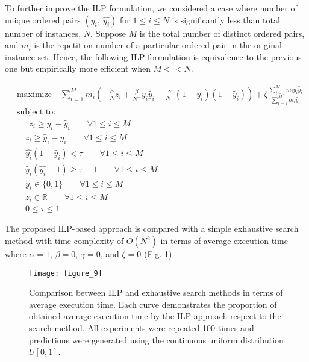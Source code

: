 \documentclass[a4paper]{article}
\begin{document}
To further improve the ILP formulation, we considered a case where number of unique ordered pairs $(y_i,\: \hat{y_i})$ for $1 \le i \le N$ is significantly less than total number of instances, $N$. Suppose $M$ is the total number of distinct ordered pairs, and $m_i$ is the repetition number of a particular ordered pair in the original instance set. Hence, the following ILP formulation is equivalence to the previous one but empirically more efficient when $M << N$.

\begin{equation}
\label{improved_ilp}
\begin{aligned}
&\text{maximize} \quad \sum_{i=1}^{M} m_i \left(-\frac{\alpha}{N}z_i + \frac{\beta}{N^+} y_i \tilde{y_i} + \frac{\gamma}{N^-} (1-y_i) (1-\tilde{y_i})\right) + \zeta \frac{\sum_{i=1}^{M} m_i y_i \tilde{y_i}}{\sum_{i=1}^{M} m_i \tilde{y_i}}\\
&\text{subject to:}\\
&\quad \: \: z_i \ge y_i - \tilde{y_i} \qquad \forall 1\le i \le M \qquad\\
& \quad z_i \ge \tilde{y_i}  - y_i \qquad \forall 1\le i \le M \qquad\\
& \quad \hat{y_i} (1 - \tilde{y_i}) < \tau \qquad \forall 1\le i \le M \qquad\\
& \quad  \tilde{y_i} (\hat{y_i} - 1) \ge \tau - 1 \qquad \forall 1\le i \le M \qquad\\
& \quad \tilde{y_i} \in \{0, 1\} \qquad \forall 1\le i \le M \\
& \quad z_i \in \mathbb{R} \qquad \forall 1\le i \le M \\
& \quad  0 \le \tau \le 1
\end{aligned}
\end{equation}

The proposed ILP-based approach is compared with a simple exhaustive search method with time complexity of $O(N^2)$ in terms of average execution time where $\alpha=1$, $\beta=0$, $\gamma=0$, and $\zeta=0$ (Fig. 1).

\begin{figure}[t]
	\texttt{[image: figure\_9]}
	\caption{Comparison between ILP and exhaustive search methods in terms of average execution time. Each curve demonstrates the proportion of obtained average execution time by the ILP approach respect to the search method. All experiments were repeated 100 times and predictions were generated using the continuous uniform distribution $U[0, 1]$.}
\end{figure}
\end{document}
